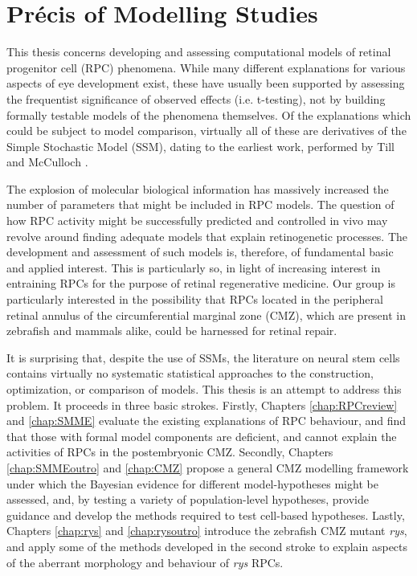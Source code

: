 \section*{Pr\'{e}cis of Modelling Studies}
\label{ch:precis}

This thesis concerns developing and assessing computational models of retinal progenitor cell (RPC) phenomena. While many different explanations for various aspects of eye development exist, these have usually been supported by assessing the frequentist significance of observed effects (i.e. t-testing), not by building formally testable models of the phenomena themselves. Of the explanations which could be subject to model comparison, virtually all of these are derivatives of the Simple Stochastic Model (SSM), dating to the earliest work, performed by Till and McCulloch \cite{Till1964}.

The explosion of molecular biological information has massively increased the number of parameters that might be included in RPC models. The question of how RPC activity might be successfully predicted and controlled in vivo may revolve around finding adequate models that explain retinogenetic processes. The development and assessment of such models is, therefore, of fundamental basic and applied interest. This is particularly so, in light of increasing interest in entraining RPCs for the purpose of retinal regenerative medicine. Our group is particularly interested in the possibility that RPCs located in the peripheral retinal annulus of the circumferential marginal zone (CMZ), which are present in zebrafish and mammals alike, could be harnessed for retinal repair.

It is surprising that, despite the use of SSMs, the literature on neural stem cells contains virtually no systematic statistical approaches to the construction, optimization, or comparison of models. This thesis is an attempt to address this problem. It proceeds in three basic strokes. Firstly, Chapters \ref{chap:RPCreview} and \ref{chap:SMME} evaluate the existing explanations of RPC behaviour, and find that those with formal model components are deficient, and cannot explain the activities of RPCs in the postembryonic CMZ. Secondly, Chapters \ref{chap:SMMEoutro} and \ref{chap:CMZ} propose a general CMZ modelling framework under which the Bayesian evidence for different model-hypotheses might be assessed, and, by testing a variety of population-level hypotheses, provide guidance and develop the methods required to test cell-based hypotheses. Lastly, Chapters \ref{chap:rys} and \ref{chap:rysoutro} introduce the zebrafish CMZ mutant \textit{rys}, and apply some of the methods developed in the second stroke to explain aspects of the aberrant morphology and behaviour of \textit{rys} RPCs. 